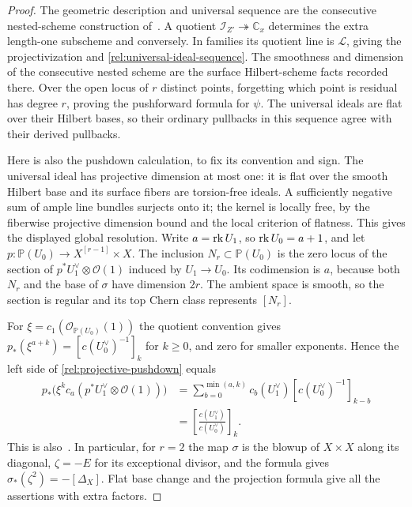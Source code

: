 \begin{proof}
The geometric description and universal sequence are the consecutive
nested-scheme construction of~\cite[Section~1, equations~(3)--(6)]{EGL}.
A quotient $\mathcal I_{Z'}\twoheadrightarrow\mathbb C_x$ determines
the extra length-one subscheme and conversely.  In families its quotient
line is $\mathcal L$, giving the projectivization and
\eqref{rel:universal-ideal-sequence}.  The smoothness and dimension of
the consecutive nested scheme are the surface Hilbert-scheme facts
recorded there.  Over the open locus of $r$ distinct points, forgetting
which point is residual has degree $r$, proving the pushforward
formula for $\psi$.  The universal ideals are flat over their Hilbert
bases, so their ordinary pullbacks in this sequence agree with their
derived pullbacks.

Here is also the pushdown calculation, to fix its convention and sign.
The universal ideal has projective dimension at most one: it is flat
over the smooth Hilbert base and its surface fibers are torsion-free
ideals.  A sufficiently negative sum of ample line bundles surjects
onto it; the kernel is locally free, by the fiberwise projective
dimension bound and the local criterion of flatness.  This gives the
displayed global resolution.  Write $a=\operatorname{rk} U_1$, so $\operatorname{rk} U_0=a+1$,
and let $p:\mathbb P(U_0)\to X^{[r-1]}\times X$.
The inclusion $N_r\subset\mathbb P(U_0)$ is the zero locus of the
section of $p^*U_1^\vee\otimes\mathcal O(1)$ induced by $U_1\to U_0$.
Its codimension is $a$, because both $N_r$ and the base of $\sigma$
have dimension $2r$.  The ambient space is smooth, so the section is
regular and its top Chern class represents $[N_r]$.

For $\xi=c_1(\mathcal O_{\mathbb P(U_0)}(1))$ the quotient convention
gives
$p_*(\xi^{a+k})=[c(U_0^\vee)^{-1}]_k$ for $k\geq0$, and zero for
smaller exponents.  Hence the left side of
\eqref{rel:projective-pushdown} equals
\[
 \begin{split}
 p_*\bigl(\xi^k c_a(p^*U_1^\vee\otimes\mathcal O(1))\bigr)
 &=\sum_{b=0}^{\min(a,k)}c_b(U_1^\vee)
       [c(U_0^\vee)^{-1}]_{k-b}\\
 &=\left[\frac{c(U_1^\vee)}{c(U_0^\vee)}\right]_k.
 \end{split}
\]
This is also~\cite[Section~1, Lemma~1.1]{EGL}.  In particular, for
$r=2$ the map $\sigma$ is the blowup of $X\times X$ along its diagonal,
$\zeta=-E$ for its exceptional divisor, and the formula gives
$\sigma_*(\zeta^2)=-[\Delta_X]$.  Flat base change and the projection
formula give all the assertions with extra factors.
\end{proof}

